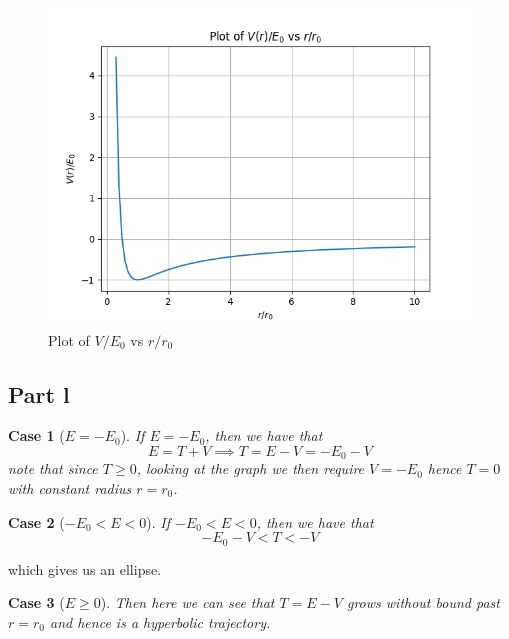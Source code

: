 \documentclass[12pt]{report}
\newtheorem{case}{Case}
\begin{document}
\begin{figure}[H]
    \centering
    \includegraphics[scale=0.7]{CSE_389D/ps_1/Q3_Pk.png}
    \caption{Plot of $V/E_0$ vs $r/r_0$}
    \label{fig:enter-label}
\end{figure}

\subsection*{Part l}
\begin{case}[$E = -E_0$]
    If $E = -E_0$, then we have that
    \begin{equation*}
        E = T + V \implies T = E - V = -E_0 - V
    \end{equation*}
    note that since $T \geq 0$, looking at the graph we then require $V = -E_0$ hence $T = 0$ with constant radius $r = r_0$. 
\end{case}
\begin{case}[$-E_0 < E < 0$]
    If $-E_0 < E < 0$, then we have that
    \begin{equation*}
     -E_0 - V < T < -V
    \end{equation*}
\end{case}
which gives us an ellipse.

\begin{case}[$E \geq 0$]
    Then here we can see that $T  = E - V$ grows without bound past $r = r_0$ and hence is a hyperbolic trajectory.
\end{case}
\end{document}
